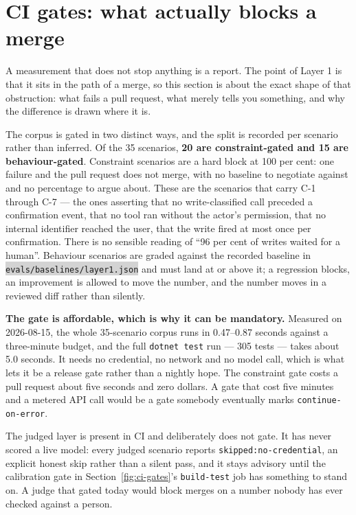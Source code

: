 \documentclass[11pt,a4paper]{article}
\newcommand{\repopath}[1]{\colorbox{lightgray}{\texttt{#1}}}
\newcommand{\finding}[1]{{\color{primaryblue}\textbf{#1}}}
\begin{document}
\section{CI gates: what actually blocks a merge}

A measurement that does not stop anything is a report. The point of Layer 1 is that it sits in the path of a merge, so this section is about the exact shape of that obstruction: what fails a pull request, what merely tells you something, and why the difference is drawn where it is.

The corpus is gated in two distinct ways, and the split is recorded per scenario rather than inferred. Of the 35 scenarios, \textbf{20 are constraint-gated and 15 are behaviour-gated}. Constraint scenarios are a hard block at 100 per cent: one failure and the pull request does not merge, with no baseline to negotiate against and no percentage to argue about. These are the scenarios that carry C-1 through C-7 --- the ones asserting that no write-classified call preceded a confirmation event, that no tool ran without the actor's permission, that no internal identifier reached the user, that the write fired at most once per confirmation. There is no sensible reading of ``96 per cent of writes waited for a human''. Behaviour scenarios are graded against the recorded baseline in \repopath{evals/baselines/layer1.json} and must land at or above it; a regression blocks, an improvement is allowed to move the number, and the number moves in a reviewed diff rather than silently.

\finding{The gate is affordable, which is why it can be mandatory.} Measured on 2026-08-15, the whole 35-scenario corpus runs in 0.47--0.87 seconds against a three-minute budget, and the full \texttt{dotnet test} run --- 305 tests --- takes about 5.0 seconds. It needs no credential, no network and no model call, which is what lets it be a release gate rather than a nightly hope. The constraint gate costs a pull request about five seconds and zero dollars. A gate that cost five minutes and a metered API call would be a gate somebody eventually marks \texttt{continue-on-error}.

The judged layer is present in CI and deliberately does not gate. It has never scored a live model: every judged scenario reports \texttt{skipped:no-credential}, an explicit honest skip rather than a silent pass, and it stays advisory until the calibration gate in Section~\ref{fig:ci-gates}'s \texttt{build-test} job has something to stand on. A judge that gated today would block merges on a number nobody has ever checked against a person.
\end{document}
